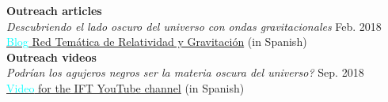 \documentclass[11pt,a4paper]{article}
\newcommand{\secsize}{0.20\linewidth}
\newcommand{\contsize}{0.80\linewidth}
\newcommand{\contsizelong}{0.95\linewidth}
\newcommand{\sectionsep}{12pt}
\begin{document}
\begin{minipage}[t]{\contsizelong}
\begin{flushleft}
\vspace{5pt}
\textbf{Outreach articles} \\
\emph{Descubriendo el lado oscuro del universo con ondas gravitacionales} \hfill Feb. 2018\\
\href{https://redtrg.wordpress.com/2018/03/05/descubriendo-el-lado-oscuro-del-universo-con-ondas-gravitacionales/}{\textcolor{cyan}{Blog} Red Tem\'atica de Relatividad y Gravitaci\'on} (in Spanish) \\
\vspace{5pt}
\textbf{Outreach videos} \\
\emph{Podr\'ian los agujeros negros ser la materia oscura del universo?} \hfill Sep. 2018\\
\href{https://youtu.be/hhxmuuqPo68}{\textcolor{cyan}{Video} for the IFT YouTube channel} (in Spanish) \\
%
\end{flushleft}
\end{minipage}

%
%
%
\end{document}
